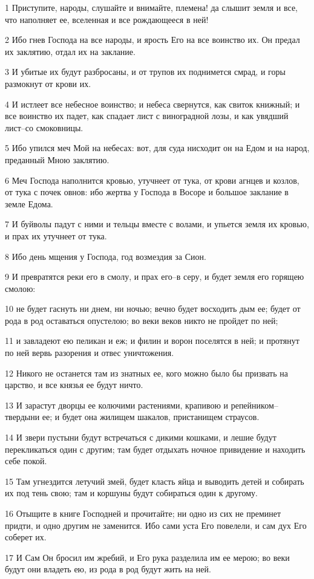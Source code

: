\par 1 Приступите, народы, слушайте и внимайте, племена! да слышит земля и все, что наполняет ее, вселенная и все рождающееся в ней!
\par 2 Ибо гнев Господа на все народы, и ярость Его на все воинство их. Он предал их заклятию, отдал их на заклание.
\par 3 И убитые их будут разбросаны, и от трупов их поднимется смрад, и горы размокнут от крови их.
\par 4 И истлеет все небесное воинство; и небеса свернутся, как свиток книжный; и все воинство их падет, как спадает лист с виноградной лозы, и как увядший лист--со смоковницы.
\par 5 Ибо упился меч Мой на небесах: вот, для суда нисходит он на Едом и на народ, преданный Мною заклятию.
\par 6 Меч Господа наполнится кровью, утучнеет от тука, от крови агнцев и козлов, от тука с почек овнов: ибо жертва у Господа в Восоре и большое заклание в земле Едома.
\par 7 И буйволы падут с ними и тельцы вместе с волами, и упьется земля их кровью, и прах их утучнеет от тука.
\par 8 Ибо день мщения у Господа, год возмездия за Сион.
\par 9 И превратятся реки его в смолу, и прах его--в серу, и будет земля его горящею смолою:
\par 10 не будет гаснуть ни днем, ни ночью; вечно будет восходить дым ее; будет от рода в род оставаться опустелою; во веки веков никто не пройдет по ней;
\par 11 и завладеют ею пеликан и еж; и филин и ворон поселятся в ней; и протянут по ней вервь разорения и отвес уничтожения.
\par 12 Никого не останется там из знатных ее, кого можно было бы призвать на царство, и все князья ее будут ничто.
\par 13 И зарастут дворцы ее колючими растениями, крапивою и репейником--твердыни ее; и будет она жилищем шакалов, пристанищем страусов.
\par 14 И звери пустыни будут встречаться с дикими кошками, и лешие будут перекликаться один с другим; там будет отдыхать ночное привидение и находить себе покой.
\par 15 Там угнездится летучий змей, будет класть яйца и выводить детей и собирать их под тень свою; там и коршуны будут собираться один к другому.
\par 16 Отыщите в книге Господней и прочитайте; ни одно из сих не преминет придти, и одно другим не заменится. Ибо сами уста Его повелели, и сам дух Его соберет их.
\par 17 И Сам Он бросил им жребий, и Его рука разделила им ее мерою; во веки будут они владеть ею, из рода в род будут жить на ней.

